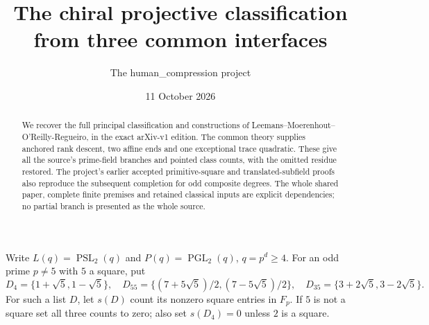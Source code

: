 \documentclass[11pt,a4paper]{article}
\title{The chiral projective classification from three common interfaces}
\author{The human\_compression project}\date{11 October 2026}
\newcommand{\PSL}{\operatorname{PSL}}\newcommand{\PGL}{\operatorname{PGL}}
\begin{document}
\maketitle
\begin{abstract}
We recover the full principal classification and constructions of
Leemans--Moerenhout--O'Reilly-Regueiro, in the exact arXiv-v1 edition.
The common theory supplies anchored rank descent, two affine ends and
one exceptional trace quadratic. These give all the source's prime-field
branches and pointed class counts, with the omitted residue restored.
The project's earlier accepted primitive-square and translated-subfield
proofs also reproduce the subsequent completion for odd composite degrees.
The whole shared paper, complete finite premises and retained classical
inputs are explicit dependencies; no partial branch is presented as the
whole source.
\end{abstract}

Write $L(q)=\PSL_2(q)$ and $P(q)=\PGL_2(q)$, $q=p^d\ge4$.
For an odd prime $p\ne5$ with $5$ a square, put
\[
 D_4=\{1+\sqrt5,1-\sqrt5\},\quad
 D_{55}=\{(7+5\sqrt5)/2,(7-5\sqrt5)/2\},\quad
 D_{35}=\{3+2\sqrt5,3-2\sqrt5\}.
\]
For such a list $D$, let $s(D)$ count its nonzero square entries in
$F_p$. If $5$ is not a square set all three counts to zero; also set
$s(D_4)=0$ unless $2$ is a square.
\end{document}
